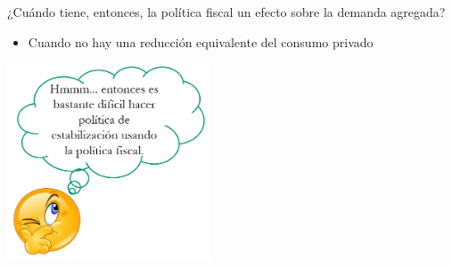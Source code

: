 \documentclass{beamer}
\begin{document}


\begin{frame}{¿Cuándo tiene, entonces, la política fiscal un efecto sobre la demanda agregada?}

    \begin{itemize}
    \item Cuando no hay una reducción equivalente del consumo privado
    \end{itemize}
     \vspace{3mm}
    
    \centering\includegraphics[width=6cm]{P95b.png}\

\end{frame}

\end{document}
